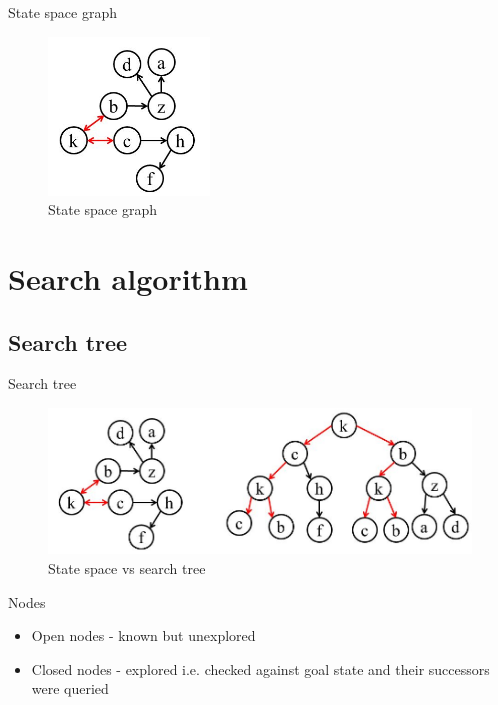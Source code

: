 \documentclass{beamer}
\begin{document}
\begin{frame}{State space graph}
	\pause
	\begin{figure}
	\centering
		\includegraphics[width=0.6\linewidth]{state_space_graph.png}
		\caption{State space graph}
	\end{figure}
\end{frame}

\section{Search algorithm}

\subsection{Search tree}

\begin{frame}{Search tree}

	\begin{figure}
	\centering
		\includegraphics[width=\linewidth]{state_space_vs_search_tree.png}
		\caption{State space vs search tree}
	\end{figure}

\end{frame}

\begin{frame}{Nodes}

	\begin{itemize}
		\item Open nodes - known but unexplored
		\item Closed nodes - explored i.e. checked against goal state and their successors were queried
	\end{itemize}

\end{frame}
\end{document}
